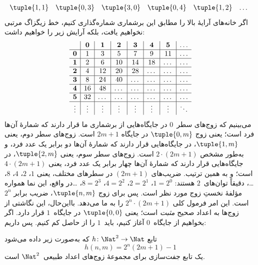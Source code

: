 \documentclass[../../../include/open-logic-section]{subfiles}
\begin{document}
\begin{explain}
\[\begin{array}{@{}cc c c c c c c c c c@{}}
\tuple{1,1} & \tuple{0,3} & \tuple{3,0}  & \tuple{0,4} &  \tuple{1,2} & \dots \\
\end{array}
\]
اگر خانه‌های آرایهٔ بالا را مطابق این برشماری شماره‌گذاری کنیم، خط
زیگزاگ مرتبی نخواهیم یافت، بلکه آرایش زیر را خواهیم داشت:
\[
\begin{array}{ c | c | c | c | c | c | c | c }
& \mathbf 0 & \mathbf 1 & \mathbf 2 & \mathbf 3 & \mathbf 4 & \mathbf 5 & \dots \\
\hline
\mathbf 0 & 1 & 3 & 5 & 7 & 9 & 11 & \dots \\
\hline
\mathbf 1 & 2 & 6 & 10 & 14 & 18 & \dots & \dots \\
\hline
\mathbf 2 & 4 & 12 & 20 & 28 & \dots & \dots & \dots \\
\hline
\mathbf 3 & 8 & 24 & 40 & \dots & \dots & \dots & \dots \\
\hline
\mathbf 4 & 16 & 48 & \dots & \dots & \dots & \dots & \dots \\
\hline
\mathbf 5 & 32 & \dots & \dots & \dots & \dots & \dots & \dots \\
\hline
\vdots & \vdots & \vdots & \vdots & \vdots & \vdots & \vdots & \ddots\\
\end{array}
\]
می‌بینیم که زوج‌های سطر~$0$ در جایگاه‌هایی از برشماری ما قرار دارند
که شمارهٔ آن‌ها فرد است؛ یعنی زوج $\tuple{0,m}$ در جایگاه $2m+1$ است. زوج‌های سطر
دوم، یعنی $\tuple{1,m}$، در جایگاه‌هایی قرار دارند که شمارهٔ آن‌ها دو
برابر یک عدد فرد، و به‌طور مشخص $2 \cdot (2m+1)$ است. زوج‌های سطر سوم،
یعنی $\tuple{2,m}$، در جایگاه‌هایی قرار دارند که شمارهٔ آن‌ها چهار برابر
یک عدد فرد، یعنی $4 \cdot (2m+1)$ است؛ و به همین ترتیب. ضریب‌های
$(2m+1)$ در سطرهای مختلف، یعنی $1$، $2$، $4$، $8$، \dots، دقیقاً توان‌های~$2$
هستند: $1= 2^0$، $2 = 2^1$، $4 = 2^2$، $8 = 2^3$، \dots\@ در واقع،
این نما همواره مؤلفهٔ نخستِ زوج مورد نظر است. پس برای زوج
$\tuple{n,m}$، ضریب برابر $2^n$ است. این امر فرمول کلی
$2^n \cdot (2m+1)$ را به ما می‌دهد. بااین‌حال، این نگاشتی از زوج‌ها به
اعداد صحیح \emph{مثبت} است؛ یعنی $\tuple{0,0}$ در جایگاه~$1$ قرار دارد.
اگر بخواهیم از جایگاه~$0$ آغاز کنیم، باید~$1$ را از حاصل کم کنیم. پس داریم:
\end{explain}

\begin{ex}
تابع $h\colon \Nat^2 \to \Nat$ که به‌صورت زیر داده می‌شود
\[
h(n,m) = 2^n (2m+1) - 1
\]
یک تابع جفت‌سازی برای مجموعهٔ زوج‌های اعداد طبیعی~$\Nat^2$ است.
\end{ex}
\end{document}
